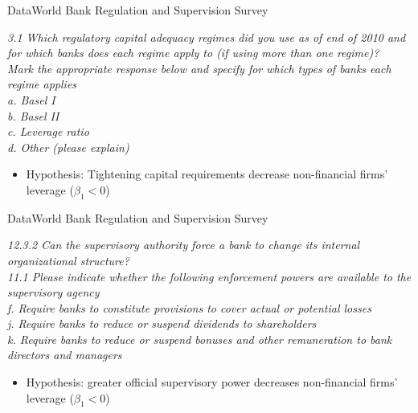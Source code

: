 \documentclass{beamer}
\begin{document}
\begin{frame}{Data}{World Bank Regulation
	and Supervision Survey \citep{barth2013bank}}

\textit{3.1 Which regulatory capital adequacy regimes did you use as of end of 2010 and for which banks does each regime apply to (if using more than one regime)?\\
	Mark the appropriate response below and specify for which types of banks each regime applies\\
	a. Basel I\\
	b. Basel II\\
	c. Leverage ratio\\
	d. Other (please explain)
}
\begin{itemize}
	\item Hypothesis: Tightening capital requirements decrease non-financial firms' leverage ($\beta_1<0$)
	
\end{itemize}

\end{frame}

\begin{frame}{Data}{World Bank Regulation
	and Supervision Survey \citep{barth2013bank}}

\textit{12.3.2 Can the supervisory authority force a bank to change its internal organizational structure?}	\\  
\vspace{\baselineskip}
	\textit{11.1 Please indicate whether the following enforcement powers are available to the supervisory agency\\
f. Require banks to constitute provisions to cover actual or potential losses \\
j. Require banks to reduce or suspend dividends to shareholders \\
k. Require banks to reduce or suspend bonuses and other remuneration to bank directors and managers}
\vspace{\baselineskip}
\begin{itemize}
	\item Hypothesis: greater official supervisory power decreases non-financial firms' leverage ($\beta_1<0$)
	
\end{itemize}

\end{frame}
\end{document}
